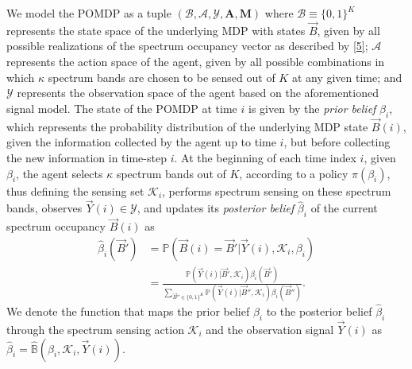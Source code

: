 \documentclass[10pt,twocolumn]{IEEEtran}
\begin{document}
We model the POMDP as a tuple $(\mathcal B,\mathcal{A},\mathcal{Y},\mathbf{A},\mathbf{M})$ where $\mathcal{B}\equiv\{0,1\}^K$ represents the state space of the underlying MDP with states $\vec{B}$, given by all possible realizations of the spectrum occupancy vector as described by \eqref{5}; $\mathcal{A}$ represents the action space of the agent, given by all possible combinations in which $\kappa$ spectrum bands are chosen to be sensed out of $K$ at any given time; and $\mathcal{Y}$ represents the observation space of the agent based on the aforementioned signal model. The state of the POMDP at time $i$ is given by the \emph{prior belief} $\beta_i$, which represents the probability distribution of the underlying MDP state $\vec{B}(i)$, given the information collected by the agent up to time $i$, but before collecting the new information in time-step $i$. At the beginning of each time index $i$, given $\beta_i$, the agent selects $\kappa$ spectrum bands out of $K$, according to a policy $\pi(\beta_i)$, thus defining the sensing set $\mathcal K_i$, performs spectrum sensing  on these spectrum bands, observes $\vec{Y}(i){\in} \mathcal{Y}$, and updates its \emph{posterior belief} $\hat{\beta}_i$ of the current spectrum occupancy $\vec{B}(i)$ as 
\begin{align}\label{11}
\hat\beta_i(\vec{B}') &= \mathbb{P}(\vec{B}(i) = \vec{B}'|\vec{Y}(i), \mathcal K_i, \beta_i)\\&=
\nonumber
\frac{\mathbb{P}(\vec{Y}(i)|\vec{B}', \mathcal{K}_i) \beta_i(\vec{B}')}{
\sum_{\vec{B}'' {\in} \{0,1\}^K} \mathbb{P}(\vec{Y}(i)|\vec{B}'', \mathcal{K}_i) \beta_i(\vec{B}'')}.
\end{align}
We denote the function that maps the prior belief $\beta_i$ to the posterior belief $\hat\beta_i$ through the spectrum sensing action $\mathcal K_i$ and the observation signal $\vec{Y}(i)$ as $\hat\beta_i{=}\hat{\mathbb B}(\beta_i, \mathcal K_i, \vec{Y}(i))$.
\end{document}
